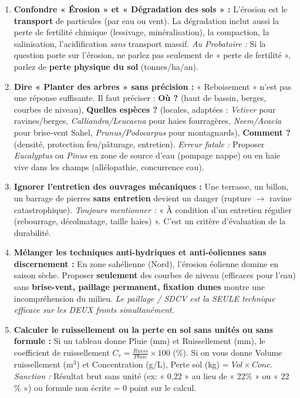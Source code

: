 \documentclass[11pt]{article}
\begin{document}
\begin{attention}
    \begin{enumerate}
        \item \textbf{Confondre « Érosion » et « Dégradation des sols » :} L'érosion est le \textbf{transport} de particules (par eau ou vent). La dégradation inclut aussi la perte de fertilité chimique (lessivage, minéralisation), la compaction, la salinisation, l'acidification \emph{sans} transport massif. \textit{Au Probatoire :} Si la question porte sur l'érosion, ne parlez pas seulement de « perte de fertilité », parlez de \textbf{perte physique du sol} (tonnes/ha/an).
        \item \textbf{Dire « Planter des arbres » sans précision :} « Reboisement » n'est pas une réponse suffisante. Il faut préciser : \textbf{Où ?} (haut de bassin, berges, courbes de niveau), \textbf{Quelles espèces ?} (locales, adaptées : \emph{Vetiver} pour ravines/berges, \emph{Calliandra/Leucaena} pour haies fourragères, \emph{Neem/Acacia} pour brise-vent Sahel, \emph{Prunus/Podocarpus} pour montagnards), \textbf{Comment ?} (densité, protection feu/pâturage, entretien). \textit{Erreur fatale :} Proposer \emph{Eucalyptus} ou \emph{Pinus} en zone de source d'eau (pompage nappe) ou en haie vive dans les champs (allélopathie, concurrence eau).
        \item \textbf{Ignorer l'entretien des ouvrages mécaniques :} Une terrasse, un billon, un barrage de pierres \textbf{sans entretien} devient un danger (rupture $\rightarrow$ ravine catastrophique). \textit{Toujours mentionner :} « À condition d'un entretien régulier (rebourrage, décolmatage, taille haies) ». C'est un critère d'évaluation de la durabilité.
        \item \textbf{Mélanger les techniques anti-hydriques et anti-éoliennes sans discernement :} En zone sahélienne (Nord), l'érosion éolienne domine en saison sèche. Proposer \textbf{seulement} des courbes de niveau (efficaces pour l'eau) sans \textbf{brise-vent, paillage permanent, fixation dunes} montre une incompréhension du milieu. \textit{Le paillage / SDCV est la SEULE technique efficace sur les DEUX fronts simultanément.}
        \item \textbf{Calculer le ruissellement ou la perte en sol sans unités ou sans formule :} Si un tableau donne Pluie (mm) et Ruissellement (mm), le coefficient de ruissellement $C_r = \frac{Ruiss}{Pluie} \times 100$ (\%). Si on vous donne Volume ruissellement (m$^3$) et Concentration (g/L), Perte sol (kg) = $Vol \times Conc$. \textit{Sanction :} Résultat brut sans unité (ex: « 0,22 » au lieu de « 22\% » ou « 22 \% ») ou formule non écrite = 0 point sur le calcul.
    \end{enumerate}
\end{attention}
\end{document}
